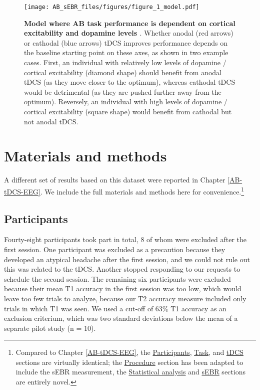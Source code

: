 \documentclass[11pt,]{memoir}
\let\rmarkdownfootnote\footnote%
\def\footnote{\protect\rmarkdownfootnote}
\begin{document}
\begin{figure}
\centering
\texttt{[image: AB\_sEBR\_files/figures/figure\_1\_model.pdf]}
\caption{\label{fig:AB-sEBR-fig-model}\textbf{Model where AB task performance is dependent on cortical excitability \autocite[left,][]{London2015} and dopamine levels \autocite[right,][]{Wiegand2016}}. Whether anodal (red arrows) or cathodal (blue arrows) tDCS improves performance depends on the baseline starting point on these axes, as shown in two example cases. First, an individual with relatively low levels of dopamine / cortical excitability (diamond shape) should benefit from anodal tDCS (as they move closer to the optimum), whereas cathodal tDCS would be detrimental (as they are pushed further away from the optimum). Reversely, an individual with high levels of dopamine / cortical excitability (square shape) would benefit from cathodal but not anodal tDCS.}
\end{figure}



\hypertarget{AB_sEBR-methods}{%
\section{Materials and methods}\label{AB_sEBR-methods}}

A different set of results based on this dataset were reported in Chapter \ref{AB-tDCS-EEG}. We include the full materials and methods here for convenience.\footnote{Compared to Chapter \ref{AB-tDCS-EEG}, the \protect\hyperlink{AB_sEBR-participants}{Participants}, \protect\hyperlink{AB_sEBR-task}{Task}, and \protect\hyperlink{AB_sEBR-tDCS}{tDCS} sections are virtually identical; the \protect\hyperlink{AB_sEBR-procedure}{Procedure} section has been adapted to include the sEBR measurement, the \protect\hyperlink{AB_sEBR-stats}{Statistical analysis} and \protect\hyperlink{AB_sEBR-sEBR}{sEBR} sections are entirely novel.}

\hypertarget{AB_sEBR-participants}{%
\subsection{Participants}\label{AB_sEBR-participants}}

Fourty-eight participants took part in total, 8 of whom were excluded after the first session. One participant was excluded as a precaution because they developed an atypical headache after the first session, and we could not rule out this was related to the tDCS. Another stopped responding to our requests to schedule the second session. The remaining six participants were excluded because their mean T1 accuracy in the first session was too low, which would leave too few trials to analyze, because our T2 accuracy measure included only trials in which T1 was seen. We used a cut-off of 63\% T1 accuracy as an exclusion criterium, which was two standard deviations below the mean of a separate pilot study (n = 10).
\end{document}
